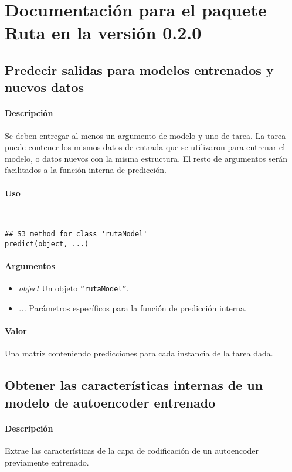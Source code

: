 \section{Documentación para el paquete Ruta en la versión 0.2.0}

\subsection{Predecir salidas para modelos entrenados y nuevos datos}

\paragraph{Descripción}
Se deben entregar al menos un argumento de modelo y uno de tarea. La tarea puede contener los mismos datos de entrada que se utilizaron para entrenar el modelo, o datos nuevos con la misma estructura. El resto de argumentos serán facilitados a la función interna de predicción.

\paragraph{Uso}
~

\begin{lstlisting}
## S3 method for class 'rutaModel'
predict(object, ...)\end{lstlisting}

\paragraph{Argumentos}
\begin{itemize}
\item \emph{object}	Un objeto \texttt{``rutaModel''}.
\item \emph{...}	Parámetros específicos para la función de predicción interna.
\end{itemize}

\paragraph{Valor}
Una matriz conteniendo predicciones para cada instancia de la tarea dada.

\subsection{Obtener las características internas de un modelo de autoencoder entrenado}

\paragraph{Descripción}
Extrae las características de la capa de codificación de un autoencoder previamente entrenado.

